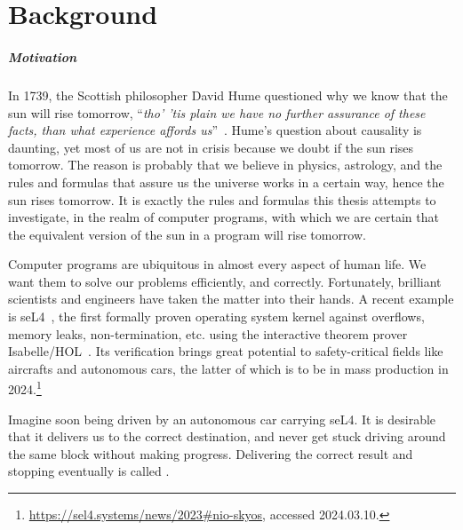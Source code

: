 \chapter{Background}\label{ch:background}
\renewcommand{\thefigure}{\arabic{chapter}.\arabic{figure}}
\renewcommand{\thetable}{\arabic{chapter}.\arabic{table}}

\paragraph{Motivation}
In 1739, the Scottish philosopher David Hume questioned why we know that the sun will rise tomorrow, ``\textit{tho' 'tis plain we have no further assurance of these facts, than what experience affords us}''~\cite{hume1896}. 
Hume's question about causality is daunting, yet most of us are not in crisis because we doubt if the sun rises tomorrow. 
The reason is probably that we believe in physics, astrology, and the rules and formulas that assure us the universe works in a certain way, hence the sun rises tomorrow. 
It is exactly the rules and formulas this thesis attempts to investigate, in the realm of computer programs, with which we are certain that the equivalent version of the sun in a program will rise tomorrow. 

Computer programs are ubiquitous in almost every aspect of human life. 
We want them to solve our problems efficiently, and correctly. 
Fortunately, brilliant scientists and engineers have taken the matter into their hands. 
A recent example is seL4~\cite{klein09}, the first formally proven operating system kernel against overflows, memory leaks, non-termination, etc. using the interactive theorem prover Isabelle/HOL~\cite{nipkow2002isabelle}. 
Its verification brings great potential to safety-critical fields like aircrafts and autonomous cars, the latter of which is to be in mass production in 2024.\footnote{\url{https://sel4.systems/news/2023\#nio-skyos}, accessed 2024.03.10. }

Imagine soon being driven by an autonomous car carrying seL4. 
It is desirable that it delivers us to the correct destination, and never get stuck driving around the same block without making progress. 
Delivering the correct result and stopping eventually is called . 

